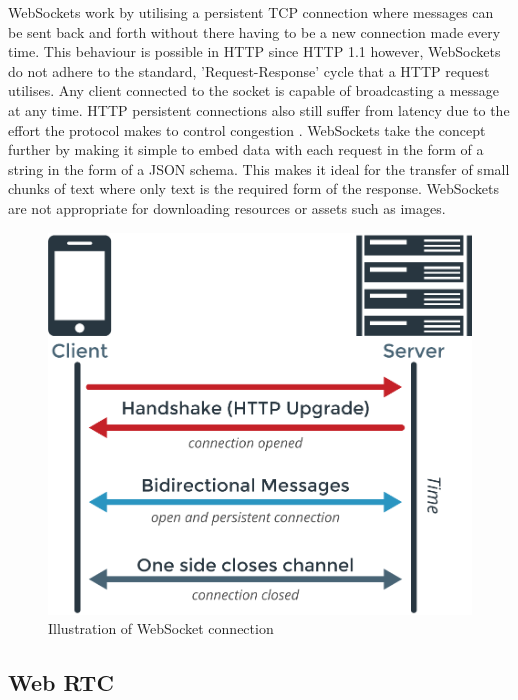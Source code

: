 WebSockets work by utilising a persistent TCP connection where messages can be sent back and forth without there having to be a new connection made every time. This behaviour is possible in HTTP since HTTP 1.1 however, WebSockets do not adhere to the standard, 'Request-Response' cycle that a HTTP request utilises. Any client connected to the socket is capable of broadcasting a message at any time. HTTP persistent connections also still suffer from latency due to the effort the protocol makes to control congestion \cite{httpvsws}. WebSockets take the concept further by making it simple to embed data with each request in the form of a string in the form of a JSON schema. This makes it ideal for the transfer of small chunks of text where only text is the required form of the response. WebSockets are not appropriate for downloading resources or assets such as images.

\begin{figure}[h!]
    \centering
    \includegraphics[scale=0.3]{res/WebSockets-Diagram.png}
    \caption{Illustration of WebSocket connection \cite{websocket-img}}
    \label{}
\end{figure}

\subsection{Web RTC}

